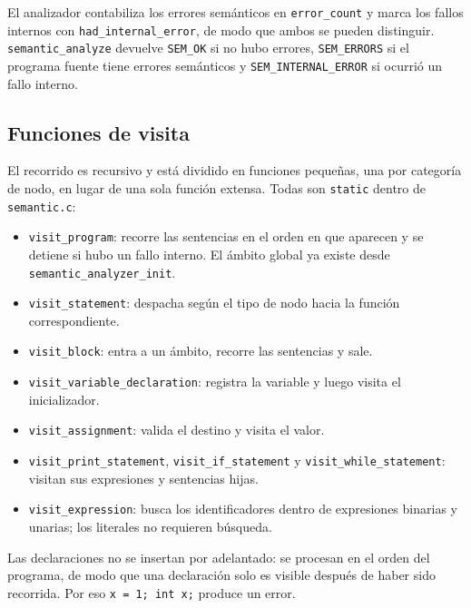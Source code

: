 \documentclass[12pt,letterpaper]{article}
\begin{document}
\bigskip

El analizador contabiliza los errores semánticos en \texttt{error\_count} y marca los fallos internos con
\texttt{had\_internal\_error}, de modo que ambos se pueden distinguir. \texttt{semantic\_analyze} devuelve
\texttt{SEM\_OK} si no hubo errores, \texttt{SEM\_ERRORS} si el programa fuente tiene errores semánticos y
\texttt{SEM\_INTERNAL\_ERROR} si ocurrió un fallo interno.

\subsection*{Funciones de visita}

El recorrido es recursivo y está dividido en funciones pequeñas, una por categoría de nodo, en lugar de una
sola función extensa. Todas son \texttt{static} dentro de \texttt{semantic.c}:

\begin{itemize}
\item \texttt{visit\_program}: recorre las sentencias en el orden en que aparecen y se detiene si hubo un
  fallo interno. El ámbito global ya existe desde \texttt{semantic\_analyzer\_init}.
  
\item \texttt{visit\_statement}: despacha según el tipo de nodo hacia la función correspondiente.

\item \texttt{visit\_block}: entra a un ámbito, recorre las sentencias y sale.

\item \texttt{visit\_variable\_declaration}: registra la variable y luego visita el inicializador.

\item \texttt{visit\_assignment}: valida el destino y visita el valor.

\item \texttt{visit\_print\_statement}, \texttt{visit\_if\_statement} y \texttt{visit\_while\_statement}:
  visitan sus expresiones y sentencias hijas.

\item \texttt{visit\_expression}: busca los identificadores dentro de expresiones binarias y unarias; los
  literales no requieren búsqueda.
\end{itemize}

Las declaraciones no se insertan por adelantado: se procesan en el orden del programa, de modo que una
declaración solo es visible después de haber sido recorrida. Por eso \texttt{x = 1; int x;} produce un error.
\end{document}
